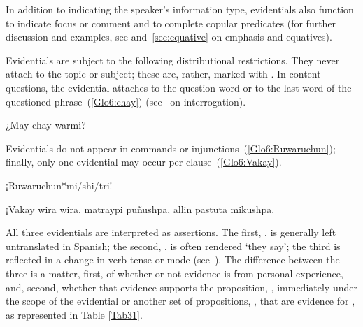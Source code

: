 In addition to indicating the speaker’s information type, evidentials also function to indicate focus or comment and to complete copular predicates (for further discussion and examples, see  and~\ref{sec:equative} on emphasis and equatives).

Evidentials are subject to the following distributional restrictions. They never attach to the topic or subject; these are, rather, marked with . In content questions, the evidential attaches to the question word or to the last word of the questioned phrase~(\ref{Glo6:chay}) (see~ on interrogation).


%
{¿May chay warmi?}%
{}%
{}{}%

\noindent
Evidentials do not appear in commands or injunctions~(\ref{Glo6:Ruwaruchun}); finally, only one evidential may occur per clause~(\ref{Glo6:Vakay}).


%
{¡Ruwaruchun*mi/shi/tri!}%
{}%
{}{}%

%
{¡Vakay wira wira, matraypi puñushpa, allin pastuta mikushpa.}%
{}%
{}{}%

All three evidentials are interpreted as assertions. The first, , is generally left untranslated in Spanish; the second, , is often rendered  ‘they say’; the third is reflected in a change in verb tense or mode (see~). The difference between the three is a matter, first, of whether or not evidence is from personal experience, and, second, whether that evidence supports the proposition, , immediately under the scope of the evidential or another set of propositions, , that are evidence for , as represented in Table \ref{Tab31}.


